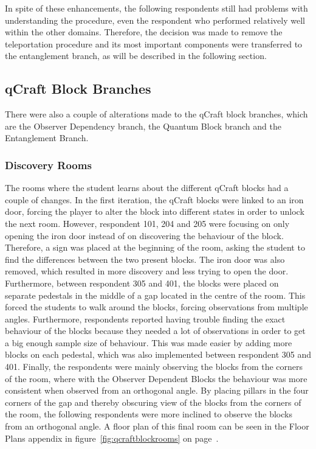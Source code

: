 \documentclass[11pt,twoside]{report} %
\begin{document}
In spite of these enhancements, the following respondents still had problems with understanding the procedure, even the respondent who performed relatively well within the other domains. Therefore, the decision was made to remove the teleportation procedure and its most important components were transferred to the entanglement branch, as will be described in the following section.

\subsection{qCraft Block Branches}

There were also a couple of alterations made to the qCraft block branches, which are the Observer Dependency branch, the Quantum Block branch and the Entanglement Branch.

\subsubsection{Discovery Rooms}

The rooms where the student learns about the different qCraft blocks had a couple of changes. In the first iteration, the qCraft blocks were linked to an iron door, forcing the player to alter the block into different states in order to unlock the next room. However, respondent 101, 204 and 205 were focusing on only opening the iron door instead of on discovering the behaviour of the block. Therefore, a sign was placed at the beginning of the room, asking the student to find the differences between the two present blocks. The iron door was also removed, which resulted in more discovery and less trying to open the door. Furthermore, between respondent 305 and 401, the blocks were placed on separate pedestals in the middle of a gap located in the centre of the room. This forced the students to walk around the blocks, forcing observations from multiple angles. Furthermore, respondents reported having trouble finding the exact behaviour of the blocks because they needed a lot of observations in order to get a big enough sample size of behaviour. This was made easier by adding more blocks on each pedestal, which was also implemented between respondent 305 and 401. Finally, the respondents were mainly observing the blocks from the corners of the room, where with the Observer Dependent Blocks the behaviour was more consistent when observed from an orthogonal angle. By placing pillars in the four corners of the gap and thereby obscuring view of the blocks from the corners of the room, the following respondents were more inclined to observe the blocks from an orthogonal angle. A floor plan of this final room can be seen in the Floor Plans appendix in figure~\ref{fig:qcraftblockrooms} on page~\pageref{fig:qcraftblockrooms}.
\end{document}
